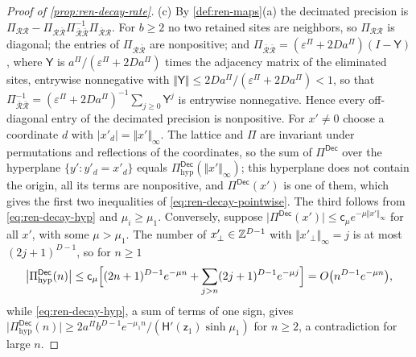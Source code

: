 \begin{proof}[Proof of \cref{prop:ren-decay-rate}]
(c) By \cref{def:ren-maps}(a) the decimated precision is $\Pi_{\mathcal R\mathcal R}-\Pi_{\mathcal R\bar{\mathcal R}}\Pi_{\bar{\mathcal R}\bar{\mathcal R}}^{-1}\Pi_{\bar{\mathcal R}\mathcal R}$. For $b\ge2$ no two retained sites are neighbors, so $\Pi_{\mathcal R\mathcal R}$ is diagonal; the entries of $\Pi_{\mathcal R\bar{\mathcal R}}$ are nonpositive; and $\Pi_{\bar{\mathcal R}\bar{\mathcal R}}=(\varepsilon^\Pi+2Da^\Pi)(I-\mathsf Y)$, where $\mathsf Y$ is $a^\Pi/(\varepsilon^\Pi+2Da^\Pi)$ times the adjacency matrix of the eliminated sites, entrywise nonnegative with $\Vert\mathsf Y\Vert\le2Da^\Pi/(\varepsilon^\Pi+2Da^\Pi)<1$, so that $\Pi_{\bar{\mathcal R}\bar{\mathcal R}}^{-1}=(\varepsilon^\Pi+2Da^\Pi)^{-1}\sum_{j\ge0}\mathsf Y^j$ is entrywise nonnegative. Hence every off-diagonal entry of the decimated precision is nonpositive. For $x'\ne0$ choose a coordinate $d$ with $\lvert x'_d\rvert=\Vert x'\Vert_\infty$. The lattice and $\Pi$ are invariant under permutations and reflections of the coordinates, so the sum of $\Pi^{\mathsf{Dec}}$ over the hyperplane $\{y':y'_d=x'_d\}$ equals $\Pi^{\mathsf{Dec}}_{\mathrm{hyp}}(\Vert x'\Vert_\infty)$; this hyperplane does not contain the origin, all its terms are nonpositive, and $\Pi^{\mathsf{Dec}}(x')$ is one of them, which gives the first two inequalities of \eqref{eq:ren-decay-pointwise}. The third follows from \eqref{eq:ren-decay-hyp} and $\mu_i\ge\mu_1$. Conversely, suppose $\lvert\Pi^{\mathsf{Dec}}(x')\rvert\le\mathsf c_\mu e^{-\mu\Vert x'\Vert_\infty}$ for all $x'$, with some $\mu>\mu_1$. The number of $x'_\perp\in\mathbb{Z}^{D-1}$ with $\Vert x'_\perp\Vert_\infty=j$ is at most $(2j+1)^{D-1}$, so for $n\ge1$
\[
\bigl\lvert\Pi^{\mathsf{Dec}}_{\mathrm{hyp}}(n)\bigr\rvert\le\mathsf c_\mu\Bigl[(2n+1)^{D-1}e^{-\mu n}+\sum_{j>n}(2j+1)^{D-1}e^{-\mu j}\Bigr]=O\bigl(n^{D-1}e^{-\mu n}\bigr),
\]
while \eqref{eq:ren-decay-hyp}, a sum of terms of one sign, gives $\lvert\Pi^{\mathsf{Dec}}_{\mathrm{hyp}}(n)\rvert\ge2a^\Pi b^{D-1}e^{-\mu_1n}/(\mathsf H'(\mathsf z_1)\sinh\mu_1)$ for $n\ge2$, a contradiction for large $n$.


\end{proof}
